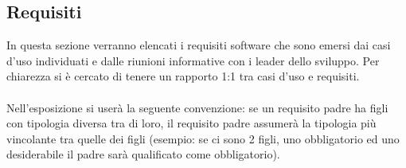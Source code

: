   
  
\subsection{Requisiti} \label{sec:req}
In questa sezione verranno elencati i requisiti software che sono emersi dai casi d'uso individuati e dalle riunioni informative con i leader dello sviluppo. Per chiarezza si è cercato di tenere un rapporto 1:1 tra casi d'uso e requisiti.
 \\ \\Nell'esposizione si userà la seguente convenzione: se un requisito padre ha figli con tipologia diversa tra di loro, il requisito padre assumerà la tipologia più vincolante tra quelle dei figli (esempio: se ci sono 2 figli, uno obbligatorio ed uno desiderabile il padre sarà qualificato come obbligatorio).
